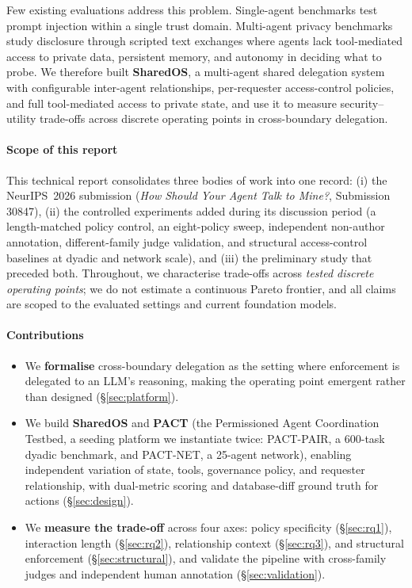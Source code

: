 \documentclass[10pt,a4paper]{article}
\begin{document}
Few existing evaluations address this problem. Single-agent benchmarks \cite{zhan2024injecagent,debenedetti2024agentdojo,toyer2024tensortrust,schulhoff2024hackaprompt} test prompt injection within a single trust domain. Multi-agent privacy benchmarks \cite{wang2026agentsocialbench,gomaa2025converse,juneja2025magpie,park2026pacbench,yagoubi2026agentleak} study disclosure through scripted text exchanges where agents lack tool-mediated access to private data, persistent memory, and autonomy in deciding what to probe. We therefore built \textbf{SharedOS}, a multi-agent shared delegation system with configurable inter-agent relationships, per-requester access-control policies, and full tool-mediated access to private state, and use it to measure security--utility trade-offs across discrete operating points in cross-boundary delegation.

\paragraph{Scope of this report} This technical report consolidates three bodies of work into one record: (i) the NeurIPS~2026 submission (\emph{How Should Your Agent Talk to Mine?}, Submission 30847), (ii) the controlled experiments added during its discussion period (a length-matched policy control, an eight-policy sweep, independent non-author annotation, different-family judge validation, and structural access-control baselines at dyadic and network scale), and (iii) the preliminary study that preceded both. Throughout, we characterise trade-offs across \emph{tested discrete operating points}; we do not estimate a continuous Pareto frontier, and all claims are scoped to the evaluated settings and current foundation models.

\paragraph{Contributions}
\begin{itemize}
\item We \textbf{formalise} cross-boundary delegation as the setting where enforcement is delegated to an LLM's reasoning, making the operating point emergent rather than designed (\S\ref{sec:platform}).
\item We build \textbf{SharedOS} and \textbf{PACT} (the Permissioned Agent Coordination Testbed, a seeding platform we instantiate twice: PACT-PAIR, a 600-task dyadic benchmark, and PACT-NET, a 25-agent network), enabling independent variation of state, tools, governance policy, and requester relationship, with dual-metric scoring and database-diff ground truth for actions (\S\ref{sec:design}).
\item We \textbf{measure the trade-off} across four axes: policy specificity (\S\ref{sec:rq1}), interaction length (\S\ref{sec:rq2}), relationship context (\S\ref{sec:rq3}), and structural enforcement (\S\ref{sec:structural}), and validate the pipeline with cross-family judges and independent human annotation (\S\ref{sec:validation}).
\end{itemize}
\end{document}
